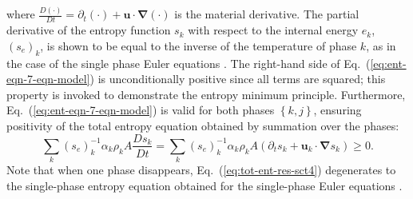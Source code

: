 \documentclass[preprint,10pt]{elsarticle}
\newcommand{\grad}{\mbold{\nabla}}
\newcommand{\mbold}[1]{\boldsymbol#1}
\newcommand{\eqt}[1]{Eq.~(\ref{#1})}                     %
\begin{document}
where $\frac{D(\cdot) }{Dt} = \partial_t (\cdot) + \mbold u \cdot \grad (\cdot)$ is the material derivative.
The partial derivative of the entropy function $s_k$ with respect to the internal energy $e_k$, $(s_e)_k$, is shown to be equal to the inverse of the temperature of phase $k$, as in the case of the single phase Euler equations \cite{jlg, Marco_dissertation}. The right-hand side of \eqt{eq:ent-eqn-7-eqn-model} is unconditionally positive since all terms are squared; this property is invoked to demonstrate the entropy minimum principle. Furthermore, \eqt{eq:ent-eqn-7-eqn-model} is valid for both phases $\left\{k, j\right\}$, ensuring positivity of the total entropy equation obtained by summation over the phases:
%
\begin{equation}\label{eq:tot-ent-res-sct4}
\sum_k (s_{e})_k^{-1} \alpha_k \rho_k A \frac{Ds_k}{Dt} = \sum_k (s_{e})_k^{-1} \alpha_k \rho_k A \left( \partial_t s_k + \mbold u_k \cdot \grad s_k \right) \geq 0  .
\end{equation}
%
Note that when one phase disappears, \eqt{eq:tot-ent-res-sct4} degenerates to the single-phase entropy equation obtained for the single-phase Euler equations \cite{SEM, Marco_dissertation}.

\end{document}
